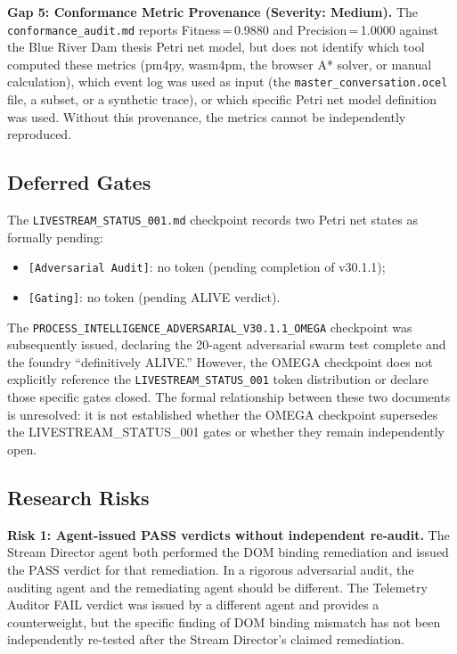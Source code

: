 \textbf{Gap 5: Conformance Metric Provenance (Severity: Medium).}
The \texttt{conformance\_audit.md} reports Fitness\,=\,0.9880 and
Precision\,=\,1.0000 against the Blue River Dam thesis Petri net model, but does
not identify which tool computed these metrics (pm4py, wasm4pm, the browser A*
solver, or manual calculation), which event log was used as input (the
\texttt{master\_conversation.ocel} file, a subset, or a synthetic trace), or which
specific Petri net model definition was used. Without this provenance, the metrics
cannot be independently reproduced.

\subsection{Deferred Gates}
\label{sec:livestream-open-deferred}

The \texttt{LIVESTREAM\_STATUS\_001.md} checkpoint records two Petri net states as
formally pending:
\begin{itemize}
  \item \texttt{[Adversarial Audit]}: no token (pending completion of v30.1.1);
  \item \texttt{[Gating]}: no token (pending ALIVE verdict).
\end{itemize}
The \texttt{PROCESS\_INTELLIGENCE\_ADVERSARIAL\_V30.1.1\_OMEGA} checkpoint was
subsequently issued, declaring the 20-agent adversarial swarm test complete and the
foundry ``definitively ALIVE.'' However, the OMEGA checkpoint does not explicitly
reference the \texttt{LIVESTREAM\_STATUS\_001} token distribution or declare those
specific gates closed. The formal relationship between these two documents is
unresolved: it is not established whether the OMEGA checkpoint supersedes the
LIVESTREAM\_STATUS\_001 gates or whether they remain independently open.

\subsection{Research Risks}
\label{sec:livestream-open-risks}

\textbf{Risk 1: Agent-issued PASS verdicts without independent re-audit.}
The Stream Director agent both performed the DOM binding remediation and issued the
PASS verdict for that remediation. In a rigorous adversarial audit, the auditing
agent and the remediating agent should be different. The Telemetry Auditor FAIL
verdict was issued by a different agent and provides a counterweight, but the
specific finding of DOM binding mismatch has not been independently re-tested after
the Stream Director's claimed remediation.

